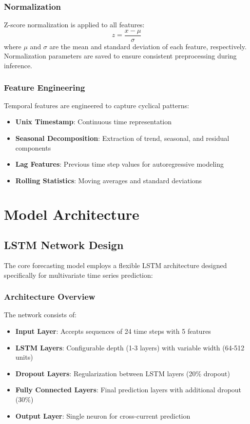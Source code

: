 \documentclass[12pt,a4paper]{article}
\begin{document}
\subsubsection{Normalization}
Z-score normalization is applied to all features:
\begin{equation}
z = \frac{x - \mu}{\sigma}
\end{equation}
where $\mu$ and $\sigma$ are the mean and standard deviation of each feature, respectively. Normalization parameters are saved to ensure consistent preprocessing during inference.

\subsubsection{Feature Engineering}
Temporal features are engineered to capture cyclical patterns:
\begin{itemize}
    \item \textbf{Unix Timestamp}: Continuous time representation
    \item \textbf{Seasonal Decomposition}: Extraction of trend, seasonal, and residual components
    \item \textbf{Lag Features}: Previous time step values for autoregressive modeling
    \item \textbf{Rolling Statistics}: Moving averages and standard deviations
\end{itemize}

\section{Model Architecture}

\subsection{LSTM Network Design}
The core forecasting model employs a flexible LSTM architecture designed specifically for multivariate time series prediction:

\subsubsection{Architecture Overview}
The network consists of:
\begin{itemize}
    \item \textbf{Input Layer}: Accepts sequences of 24 time steps with 5 features
    \item \textbf{LSTM Layers}: Configurable depth (1-3 layers) with variable width (64-512 units)
    \item \textbf{Dropout Layers}: Regularization between LSTM layers (20\% dropout)
    \item \textbf{Fully Connected Layers}: Final prediction layers with additional dropout (30\%)
    \item \textbf{Output Layer}: Single neuron for cross-current prediction
\end{itemize}
\end{document}
